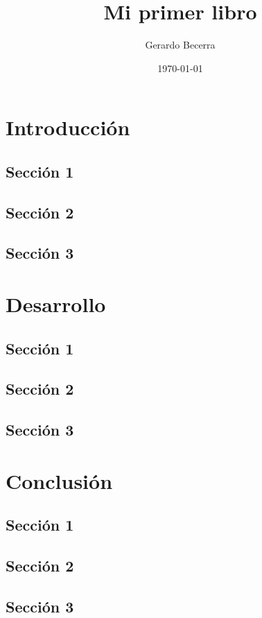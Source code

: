 \documentclass[10pt,letterpaper]{book}
\title{Mi primer libro}
\author{Gerardo Becerra}
\date{\today}
\begin{document}
  \maketitle

  \tableofcontents

  \chapter{Introducción}
  \section{Sección 1}
  \lipsum[1-10]
  \section{Sección 2}
  \lipsum[1-10]
  \section{Sección 3}
  \lipsum[1-10]

  \chapter{Desarrollo}
  \section{Sección 1}
  \lipsum[1-10]
  \section{Sección 2}
  \lipsum[1-10]
  \section{Sección 3}
  \lipsum[1-10]

  \chapter{Conclusión}
  \section{Sección 1}
  \lipsum[1-10]
  \section{Sección 2}
  \lipsum[1-10]
  \section{Sección 3}
  \lipsum[1-10]
\end{document}
